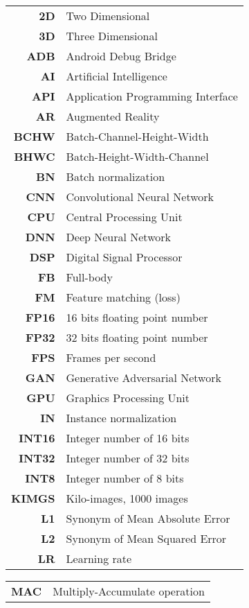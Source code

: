 \begin{changemargin}{-1.5cm}{0cm}
\begin{tabular}{@{}>{\bf}r l}
	2D & Two Dimensional \\
	3D & Three Dimensional \\
	ADB & Android Debug Bridge \\
	AI & Artificial Intelligence \\
	API & Application Programming Interface \\
	AR & Augmented Reality \\
	BCHW & Batch-Channel-Height-Width \\
	BHWC & Batch-Height-Width-Channel \\
	BN & Batch normalization \\
	CNN & Convolutional Neural Network \\
	CPU & Central Processing Unit \\
	DNN & Deep Neural Network \\
	DSP & Digital Signal Processor \\
	FB & Full-body \\
	FM & Feature matching (loss) \\
	FP16 & 16 bits floating point number \\
	FP32 & 32 bits floating point number \\
	FPS & Frames per second\\
	GAN & Generative Adversarial Network \\
	GPU & Graphics Processing Unit \\
	IN & Instance normalization \\
	INT16 & Integer number of 16 bits \\
	INT32 & Integer number of 32 bits \\
	INT8 & Integer number of 8 bits \\
	KIMGS & Kilo-images, 1000 images \\
	L1 & Synonym of Mean Absolute Error \\
	L2 & Synonym of Mean Squared Error \\
	LR & Learning rate \\
\end{tabular}
\hspace{-1em}
\begin{tabular}{>{\bf}r l@{}}
	MAC & Multiply-Accumulate operation \\

\end{tabular}
\end{changemargin}
